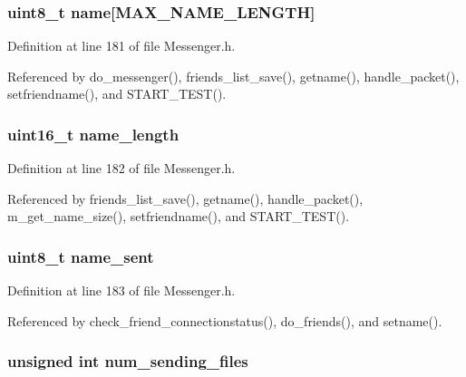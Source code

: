 \hypertarget{struct_friend_a11b8cc6595eea79e65c978209278e683}{
\subsubsection[{name}]{\setlength{\rightskip}{0pt plus 5cm}uint8\+\_\+t name\mbox{[}{\bf M\+A\+X\+\_\+\+N\+A\+M\+E\+\_\+\+L\+E\+N\+G\+T\+H}\mbox{]}}}\label{struct_friend_a11b8cc6595eea79e65c978209278e683}


Definition at line 181 of file Messenger.\+h.



Referenced by do\+\_\+messenger(), friends\+\_\+list\+\_\+save(), getname(), handle\+\_\+packet(), setfriendname(), and S\+T\+A\+R\+T\+\_\+\+T\+E\+S\+T().

\hypertarget{struct_friend_a3573d7a906b26e9999cd74f2c4066601}{
\subsubsection[{name\+\_\+length}]{\setlength{\rightskip}{0pt plus 5cm}uint16\+\_\+t name\+\_\+length}}\label{struct_friend_a3573d7a906b26e9999cd74f2c4066601}


Definition at line 182 of file Messenger.\+h.



Referenced by friends\+\_\+list\+\_\+save(), getname(), handle\+\_\+packet(), m\+\_\+get\+\_\+name\+\_\+size(), setfriendname(), and S\+T\+A\+R\+T\+\_\+\+T\+E\+S\+T().

\hypertarget{struct_friend_acc966be04e3e27e15dfd493c3e9cff89}{
\subsubsection[{name\+\_\+sent}]{\setlength{\rightskip}{0pt plus 5cm}uint8\+\_\+t name\+\_\+sent}}\label{struct_friend_acc966be04e3e27e15dfd493c3e9cff89}


Definition at line 183 of file Messenger.\+h.



Referenced by check\+\_\+friend\+\_\+connectionstatus(), do\+\_\+friends(), and setname().

\hypertarget{struct_friend_ac4dcaccdfc6f354a321622e84b27b856}{
\subsubsection[{num\+\_\+sending\+\_\+files}]{\setlength{\rightskip}{0pt plus 5cm}unsigned int num\+\_\+sending\+\_\+files}}\label{struct_friend_ac4dcaccdfc6f354a321622e84b27b856}


